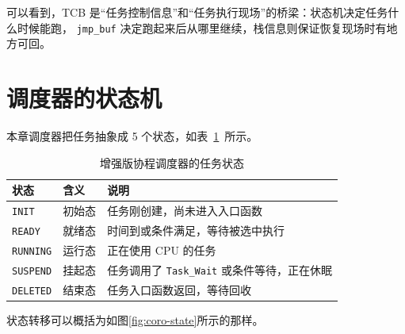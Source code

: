 可以看到，TCB 是“任务控制信息”和“任务执行现场”的桥梁：状态机决定任务什么时候能跑， \texttt{jmp\_buf} 决定跑起来后从哪里继续，栈信息则保证恢复现场时有地方可回。

\section{调度器的状态机}

本章调度器把任务抽象成 5 个状态，如表~\ref{tab:coro-state}~所示。

\begin{table}[htbp]
\centering \caption{增强版协程调度器的任务状态} \label{tab:coro-state}
    \begin{tabular}{llp{8cm}}
        \toprule
        状态 & 含义 & 说明 \\
        \midrule
        \texttt{INIT}     & 初始态 & 任务刚创建，尚未进入入口函数 \\
        \texttt{READY}    & 就绪态 & 时间到或条件满足，等待被选中执行 \\
        \texttt{RUNNING}  & 运行态 & 正在使用 CPU 的任务 \\
        \texttt{SUSPEND}  & 挂起态 & 任务调用了 \texttt{Task\_Wait} 或条件等待，正在休眠 \\
        \texttt{DELETED}  & 结束态 & 任务入口函数返回，等待回收 \\
        \bottomrule
    \end{tabular}
\end{table}

状态转移可以概括为如图\ref{fig:coro-state}所示的那样。

